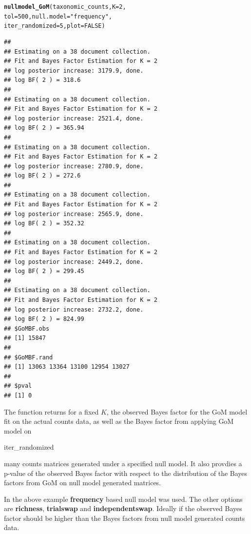 \documentclass[12pt]{article}\usepackage[]{graphicx}\usepackage[usenames,dvipsnames]{color}
\makeatletter
\newcommand{\hlnum}[1]{\textcolor[rgb]{0.686,0.059,0.569}{#1}}%
\newcommand{\hlstr}[1]{\textcolor[rgb]{0.192,0.494,0.8}{#1}}%
\newcommand{\hlstd}[1]{\textcolor[rgb]{0.345,0.345,0.345}{#1}}%
\newcommand{\hlkwc}[1]{\textcolor[rgb]{0.333,0.667,0.333}{#1}}%
\newcommand{\hlkwd}[1]{\textcolor[rgb]{0.737,0.353,0.396}{\textbf{#1}}}%
\newenvironment{kframe}{%
 \def\at@end@of@kframe{}%
 \ifinner\ifhmode%
  \def\at@end@of@kframe{\end{minipage}}%
  \begin{minipage}{\columnwidth}%
 \fi\fi%
 \def\FrameCommand##1{\hskip\@totalleftmargin \hskip-\fboxsep
 \colorbox{shadecolor}{##1}\hskip-\fboxsep
     \hskip-\linewidth \hskip-\@totalleftmargin \hskip\columnwidth}%
 \MakeFramed {\advance\hsize-\width
   \@totalleftmargin\z@ \linewidth\hsize
   \@setminipage}}%
 {\par\unskip\endMakeFramed%
 \at@end@of@kframe}
\newenvironment{knitrout}{}{} %
\makeatother
\begin{document}
\begin{knitrout}
\color{fgcolor}\begin{kframe}
\begin{alltt}
\hlkwd{nullmodel_GoM}\hlstd{(taxonomic_counts,} \hlkwc{K}\hlstd{=}\hlnum{2}\hlstd{,}
               \hlkwc{tol}\hlstd{=}\hlnum{500}\hlstd{,} \hlkwc{null.model}\hlstd{=}\hlstr{"frequency"}\hlstd{,}
               \hlkwc{iter_randomized}\hlstd{=}\hlnum{5}\hlstd{,} \hlkwc{plot}\hlstd{=}\hlnum{FALSE}\hlstd{)}
\end{alltt}
\begin{verbatim}
## 
## Estimating on a 38 document collection.
## Fit and Bayes Factor Estimation for K = 2
## log posterior increase: 3179.9, done.
## log BF( 2 ) = 318.6
## 
## Estimating on a 38 document collection.
## Fit and Bayes Factor Estimation for K = 2
## log posterior increase: 2521.4, done.
## log BF( 2 ) = 365.94
## 
## Estimating on a 38 document collection.
## Fit and Bayes Factor Estimation for K = 2
## log posterior increase: 2780.9, done.
## log BF( 2 ) = 272.6
## 
## Estimating on a 38 document collection.
## Fit and Bayes Factor Estimation for K = 2
## log posterior increase: 2565.9, done.
## log BF( 2 ) = 352.32
## 
## Estimating on a 38 document collection.
## Fit and Bayes Factor Estimation for K = 2
## log posterior increase: 2449.2, done.
## log BF( 2 ) = 299.45
## 
## Estimating on a 38 document collection.
## Fit and Bayes Factor Estimation for K = 2
## log posterior increase: 2732.2, done.
## log BF( 2 ) = 824.99
## $GoMBF.obs
## [1] 15847
## 
## $GoMBF.rand
## [1] 13063 13364 13100 12954 13027
## 
## $pval
## [1] 0
\end{verbatim}
\end{kframe}
\end{knitrout}

The function returns for a fixed $K$, the observed Bayes factor for the GoM model fit on the actual counts data, as well as the Bayes factor from applying GoM model on \begin{verb} iter_randomized \end{verb} many counts matrices generated under a specified null model. It also provdies a p-value of the observed Bayes factor with respect to the distribution of the Bayes factors from GoM on null model generated matrices.

In the above example \textbf{frequency} based null model was used. The other options are \textbf{richness}, \textbf{trialswap} and \textbf{independentswap}. Ideally if the observed Bayes factor should be higher than the Bayes factors from null model generated counts data.
\end{document}
